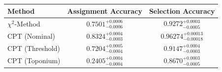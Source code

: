     \begin{tabular}{lcc}
        \toprule
        Method & Assignment Accuracy & Selection Accuracy \\
        \midrule
        $\chi^2$-Method & $0.7501^{+0.0006}_{-0.0006}$ & $0.9272^{+0.0003}_{-0.0005}$ \\
        CPT (Nominal) & $0.8324^{+0.0004}_{-0.0003}$ & $0.96274^{+0.00013}_{-0.00018}$ \\
        CPT (Threshold) & $0.7204^{+0.0005}_{-0.0004}$ & $0.9147^{+0.0004}_{-0.0003}$ \\
        CPT (Toponium) & $0.2405^{+0.0004}_{-0.0004}$ & $0.8670^{+0.0003}_{-0.0005}$ \\
        \bottomrule
    \end{tabular}